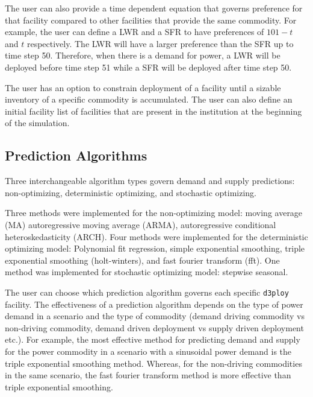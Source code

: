 \documentclass{anstrans}
\newcommand{\deploy}{\texttt{d3ploy}\xspace}%
\begin{document}
The user can also provide a time dependent equation that governs
preference for that facility compared to other facilities that 
provide the same commodity. 
For example, the user can define a \gls{LWR} and a \gls{SFR} to have
preferences of $101-t$ and $t$ respectively. 
The \gls{LWR} will have a larger preference than the \gls{SFR} up to 
time step 50.
Therefore, when there is a demand for power, a \gls{LWR}
will be deployed before time step 51 
while a \gls{SFR} will be deployed after time step 50. 

The user has an option to constrain deployment of a facility 
until a sizable inventory of a specific commodity is accumulated.  
The user can also define an initial facility list of facilities that 
are present in the institution at the beginning of the simulation. 

\subsection{\textbf{Prediction Algorithms}}
Three interchangeable algorithm types govern demand and supply 
predictions: non-optimizing, deterministic optimizing, and stochastic
optimizing. 

Three methods were implemented for the non-optimizing model: 
moving average (MA)
autoregressive moving average (ARMA), autoregressive 
conditional heteroskedasticity (ARCH).
Four methods were implemented for the deterministic optimizing model: 
Polynomial fit regression, simple exponential smoothing,  
triple exponential smoothing (holt-winters), and fast fourier 
transform (fft). 
One method was implemented for stochastic optimizing model: 
stepwise seasonal.  

The user can choose which prediction algorithm governs each specific 
\deploy facility. 
The effectiveness of a prediction algorithm depends on the type 
of power demand in a scenario and the type of commodity (demand 
driving commodity vs non-driving commodity, demand driven 
deployment vs supply driven deployment etc.). 
For example, the most effective method
for predicting demand and supply for the power commodity in a scenario  
with a sinusoidal power demand is the triple exponential smoothing method. 
Whereas, for the non-driving commodities in the same 
scenario, the fast fourier transform method is more effective than triple 
exponential smoothing. 
\end{document}
